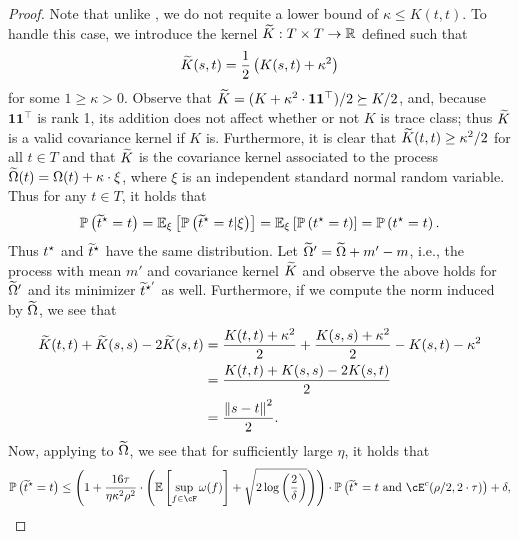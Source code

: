 \begin{proof}
    Note that unlike , we do not requite a lower bound of $\kappa \leq K(t,t)$.  To handle this case, we introduce the kernel $\widetilde{K}: T \times T \to \mathbb{R}$ defined such that
    \begin{align}
        \widetilde{K}(s,t) = \frac 12 \left( K(s,t) + \kappa^2 \right)
    \end{align}
    for some $1 \geq \kappa > 0$.  Observe that $\widetilde{K} = (K + \kappa^2 \cdot \mathbf{1} \mathbf{1}^\top)/2 \succeq K / 2$, and, because $\mathbf{1} \mathbf{1}^\top$ is rank 1, its addition does not affect whether or not $K$ is trace class; thus $\widetilde{K}$ is a valid covariance kernel if $K$ is.  Furthermore, it is clear that $\widetilde{K}(t, t) \geq \kappa^2 / 2$ for all $t \in T$ and that $\widetilde{K}$ is the covariance kernel associated to the process $\widetilde{\Omega}(t) = \Omega(t) + \kappa \cdot \xi$, where $\xi$ is an independent standard normal random variable.  Thus for any $t \in T$, it holds that
    \begin{align}\label{eq:same_distribution}
        \mathbb{P}\left( \widetilde{t}^\star = t \right) = \mathbb{E}_\xi \left[ \mathbb{P}\left( \widetilde{t}^\star = t | \xi \right) \right] = \mathbb{E}_\xi\left[ \mathbb{P}\left( t^\star = t \right) \right] = \mathbb{P}\left( t^\star = t \right).
    \end{align}
    Thus $t^\star$ and $\widetilde{t}^\star$ have the same distribution.  Let $\widetilde{\Omega}' = \widetilde{\Omega} + m' - m$, i.e., the process with mean $m'$ and covariance kernel $\widetilde{K}$ and observe the above holds for $\widetilde{\Omega}'$ and its minimizer $\widetilde{t}^{\star'}$ as well.  Furthermore, if we compute the norm induced by $\widetilde{\Omega}$, we see that
    \begin{align}
        \widetilde{K}(t,t) + \widetilde{K}(s,s) - 2 \widetilde{K}(s,t) &= \frac{K(t,t) + \kappa^2}{2} + \frac{K(s,s) + \kappa^2}{2} - K(s,t) - \kappa^2 \\
        &= \frac{K(t,t) + K(s,s) - 2 K(s,t)}{2} \\
        &= \frac{\left\|s -t\right\|^2}{2}.
    \end{align}
    Now, applying  to $\widetilde{\Omega}$, we see that for sufficiently large $\eta$, it holds that
    \begin{align}
        \pp\left( \ttilstar = t \right) \leq \left( 1 + \frac{16 \tau}{\eta \kappa^2 \rho^2} \cdot \left( \ee\left[ \sup_{f \in \cF} \omega(f) \right] + \sqrt{2 \log\left( \frac 2\delta \right)} \right) \right) \cdot \pp\left( \ttilstar = t \text{ and } \cE^c(\rho/2, 2 \cdot\tau) \right) + \delta,
    \end{align}

\end{proof}
